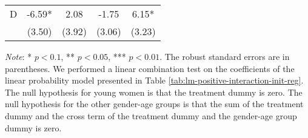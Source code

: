 \documentclass[12pt, a4paper]{article}
\begin{document}
\begin{table}[H]
\begin{threeparttable}
\begin{tabular}[t]{lcccc}
\hspace{1em}D & -6.59* & 2.08 & -1.75 & 6.15*\\
\hspace{1em} & (3.50) & (3.92) & (3.06) & (3.23)\\
\bottomrule
\end{tabular}
\begin{tablenotes}
\item \emph{Note}: * $p < 0.1$, ** $p < 0.05$, *** $p < 0.01$. The robust standard errors are in parentheses. We performed a linear combination test on the coefficients of the linear probability model presented in Table \ref{tab:lm-positive-interaction-init-reg}. The null hypothesis for young women is that the treatment dummy is zero. The null hypothesis for the other gender-age groups is that the sum of the treatment dummy and the cross term of the treatment dummy and the gender-age group dummy is zero.
\end{tablenotes}
\end{threeparttable}
\end{table}
\end{document}
